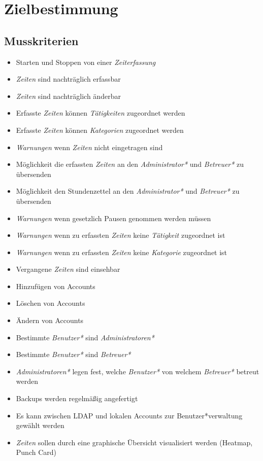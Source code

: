 \section{Zielbestimmung}

\subsection{Musskriterien}

\begin{itemize}
	\item Starten und Stoppen von einer \emph{Zeiterfassung}
	\item \emph{Zeiten} sind nachträglich erfassbar
	\item \emph{Zeiten} sind nachträglich änderbar
	\item Erfasste \emph{Zeiten} können \emph{Tätigkeiten} zugeordnet werden
	\item Erfasste \emph{Zeiten} können \emph{Kategorien} zugeordnet werden
	\item \emph{Warnungen} wenn \emph{Zeiten} nicht eingetragen sind
	\item Möglichkeit die erfassten \emph{Zeiten} an den \emph{Administrator*} und \emph{Betreuer*} zu übersenden
	\item Möglichkeit den Stundenzettel an den \emph{Administrator*} und \emph{Betreuer*} zu übersenden
	\item \emph{Warnungen} wenn gesetzlich Pausen genommen werden müssen
	\item \emph{Warnungen} wenn zu erfassten \emph{Zeiten} keine \emph{Tätigkeit} zugeordnet ist
	\item \emph{Warnungen} wenn zu erfassten \emph{Zeiten} keine \emph{Kategorie} zugeordnet ist
	\item Vergangene \emph{Zeiten} sind einsehbar
	\item Hinzufügen von Accounts
	\item Löschen von Accounts
	\item Ändern von Accounts
	\item Bestimmte \emph{Benutzer*} sind \emph{Administratoren*}
	\item Bestimmte \emph{Benutzer*} sind \emph{Betreuer*}
	\item \emph{Administratoren*} legen fest, welche \emph{Benutzer*} von welchem \emph{Betreuer*} betreut werden
	\item Backups werden regelmäßig angefertigt
	\item Es kann zwischen LDAP und lokalen Accounts zur Benutzer*verwaltung gewählt werden
	\item \emph{Zeiten} sollen durch eine graphische Übersicht visualisiert werden (Heatmap, Punch Card)
\end{itemize}


